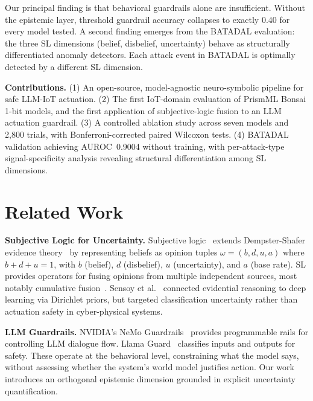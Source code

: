 \documentclass[conference]{IEEEtran}
\begin{document}
Our principal finding is that behavioral guardrails alone are insufficient. Without the epistemic layer, threshold guardrail accuracy collapses to exactly 0.40 for every model tested. A second finding emerges from the BATADAL evaluation: the three SL dimensions (belief, disbelief, uncertainty) behave as structurally differentiated anomaly detectors. Each attack event in BATADAL is optimally detected by a different SL dimension.

\textbf{Contributions.}
(1) An open-source, model-agnostic neuro-symbolic pipeline for safe LLM-IoT actuation.
(2) The first IoT-domain evaluation of PrismML Bonsai 1-bit models, and the first application of subjective-logic fusion to an LLM actuation guardrail.
(3) A controlled ablation study across seven models and 2{,}800 trials, with Bonferroni-corrected paired Wilcoxon tests.
(4) BATADAL validation achieving AUROC~0.9004 without training, with per-attack-type signal-specificity analysis revealing structural differentiation among SL dimensions.

\section{Related Work}

\textbf{Subjective Logic for Uncertainty.}
Subjective logic~\cite{josang2016subjective} extends Dempster-Shafer evidence theory~\cite{dempster1968generalization, shafer1976mathematical} by representing beliefs as opinion tuples $\omega = (b, d, u, a)$ where $b + d + u = 1$, with $b$ (belief), $d$ (disbelief), $u$ (uncertainty), and $a$ (base rate). SL provides operators for fusing opinions from multiple independent sources, most notably cumulative fusion~\cite{josang2016subjective}. Sensoy et al.~\cite{sensoy2018evidential} connected evidential reasoning to deep learning via Dirichlet priors, but targeted classification uncertainty rather than actuation safety in cyber-physical systems.

\textbf{LLM Guardrails.}
NVIDIA's NeMo Guardrails~\cite{rebedea2023nemo} provides programmable rails for controlling LLM dialogue flow. Llama Guard~\cite{inan2023llama} classifies inputs and outputs for safety. These operate at the behavioral level, constraining what the model says, without assessing whether the system's world model justifies action. Our work introduces an orthogonal epistemic dimension grounded in explicit uncertainty quantification.
\end{document}
